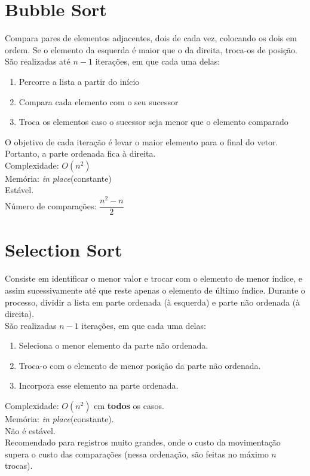 \documentclass[•]{article}
\begin{document}
	\section{Bubble Sort}
		Compara pares de elementos adjacentes, dois de cada vez, colocando os dois em ordem. Se o elemento da esquerda é maior que o da direita, troca-os de posição.\\
		São realizadas até $n-1$ iterações, em que cada uma delas:
		\begin{enumerate}
			\item Percorre a lista a partir do início
			\item Compara cada elemento com o seu sucessor
			\item Troca os elementos caso o sucessor seja menor que o elemento comparado
		\end{enumerate}
		O objetivo de cada iteração é levar o maior elemento para o final do vetor. Portanto, a parte ordenada fica à direita.\\
		Complexidade: $O(n^2)$\\	
		Memória: \textit{in place}(constante)\\
		Estável.\\
		Número de comparações: $\dfrac{n^2 - n}{2}$
		
	\section{Selection Sort}
		Consiste em identificar o menor valor e trocar com o elemento de menor índice, e assim sucessivamente até que reste apenas o elemento de último índice. Durante o processo, dividir a lista em parte ordenada (à esquerda) e parte não ordenada (à direita).\\
		São realizadas $n-1$ iterações, em que cada uma delas:
		\begin{enumerate}
			\item Seleciona o menor elemento da parte não ordenada.
			\item Troca-o com o elemento de menor posição da parte não ordenada.
			\item Incorpora esse elemento na parte ordenada.
		\end{enumerate}
		Complexidade: $O(n^2)$ em \textbf{todos} os casos.\\
		Memória: \textit{in place}(constante).\\
		Não é estável.\\
		Recomendado para registros muito grandes, onde o custo da movimentação supera o custo das comparações (nessa ordenação, são feitas no máximo $n$ trocas).
\end{document}
